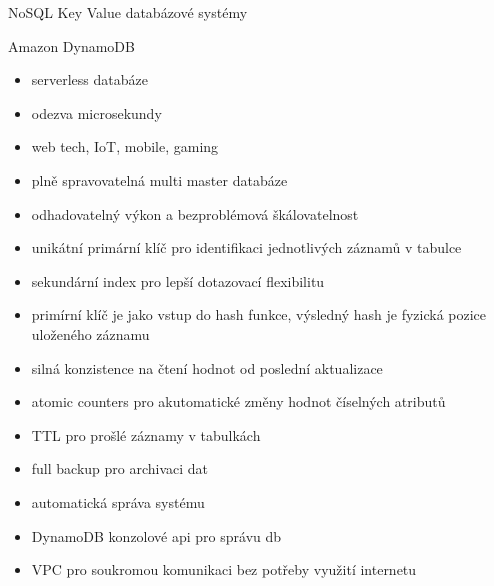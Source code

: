 \documentclass{article}
\begin{document}
	
	\begin{section}{NoSQL Key Value databázové systémy}
		\begin{subsection}{Amazon DynamoDB}
			\begin{itemize}
				\item serverless databáze
				\item odezva microsekundy
				\item web tech, IoT, mobile, gaming
				\item plně spravovatelná multi master databáze
				\item odhadovatelný výkon a bezproblémová škálovatelnost
				\item unikátní primární klíč pro identifikaci jednotlivých záznamů v tabulce
				\item sekundární index pro lepší dotazovací flexibilitu
				\item primírní klíč je jako vstup do hash funkce, výsledný hash je fyzická pozice uloženého záznamu
				\item silná konzistence na čtení hodnot od poslední aktualizace
				\item atomic counters pro akutomatické změny hodnot číselných atributů
				\item TTL pro prošlé záznamy v tabulkách
				\item full backup pro archivaci dat
				\item automatická správa systému
				\item DynamoDB konzolové api pro správu db
				\item VPC pro soukromou komunikaci bez potřeby využití internetu
			\end{itemize}
		\end{subsection}
		

\end{section}
\end{document}
